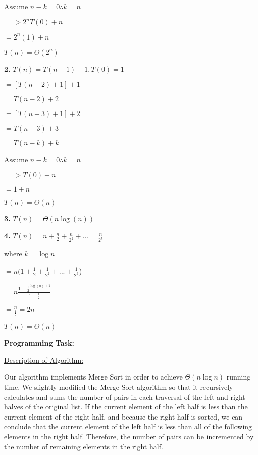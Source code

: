 \documentclass[12pt,letterpaper,final]{report}
\begin{document}
\quad Assume $n - k = 0 \therefore k = n$

\quad $=> 2^nT(0) + n$

\quad $= 2^n(1) + n$

\quad $T(n) = \Theta (2^n)$


\bigskip

\textbf{2.} $T(n) = T(n-1) + 1, T(0) = 1$

\quad $ = [T(n-2) + 1] + 1$

\quad $= T(n-2)+2$

\quad $= [T(n-3) + 1] + 2$

\quad $=T(n-3) + 3$

\quad $=T(n-k) + k$

\quad Assume $n-k = 0 \therefore k = n$

\quad $=> T(0) + n$

\quad $= 1 + n$



\quad $T(n) = \Theta(n)$

\bigskip

\textbf{3.} $T(n) = \Theta(n\log(n))$

\bigskip

\textbf{4.} $T(n) = n + \frac{n}{2} + \frac{n}{2^2} + ... = \frac{n}{2^k}$

\quad where $k = \log{n}$

\quad $=n(1+\frac{1}{2}+\frac{1}{2^2}+...+\frac{1}{2^k}$)

\quad $= n \frac{1-\frac{1}{2}^{\log(n)+1}}{1-\frac{1}{2}}$

\quad $=\frac{n}{\frac{1}{2}} = 2n$

\quad $T(n) = \Theta(n)$

\bigskip


\noindent\textbf{Programming Task:} 

\medskip

\underline{Description of Algorithm:}
\medskip

Our algorithm implements Merge Sort in order to achieve $\Theta(n\log n)$ running time. We slightly modified the Merge Sort algorithm so that it recursively calculates and sums the number of pairs in each traversal of the left and right halves of the original list. If the current element of the left half is less than the current element of the right half, and because the right half is sorted, we can conclude that the current element of the left half is less than all of the following elements in the right half. Therefore, the number of pairs can be incremented by the number of remaining elements in the right half.
\end{document}
